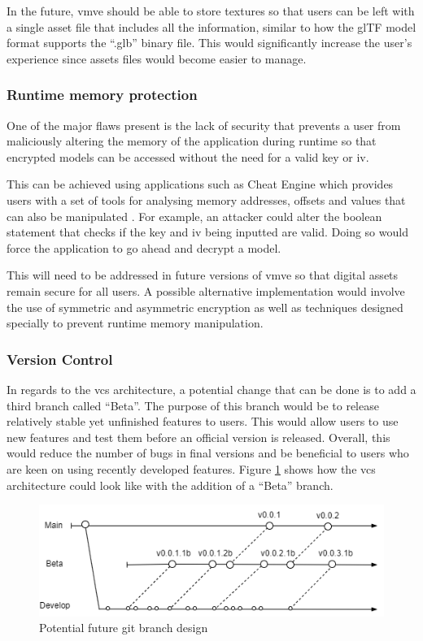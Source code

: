 \documentclass[11pt]{article}
\begin{document}
In the future, \gls*{vmve} should be able to store textures so that users can be
left with a single asset file that includes all the information, similar to how
the glTF model format supports the ``.glb'' binary file. This would
significantly increase the user's experience since assets files would become
easier to manage.

\subsubsection{Runtime memory protection}
One of the major flaws present is the lack of security that prevents a user from
maliciously altering the memory of the application during runtime so that
encrypted models can be accessed without the need for a valid key or iv.

This can be achieved using applications such as Cheat Engine which provides
users with a set of tools for analysing memory addresses, offsets and values
that can also be manipulated \cite{cheat_engine}. For example, an attacker could
alter the boolean statement that checks if the key and iv being inputted are
valid. Doing so would force the application to go ahead and decrypt a model.

This will need to be addressed in future versions of \gls*{vmve} so that digital
assets remain secure for all users. A possible alternative implementation would
involve the use of symmetric and asymmetric encryption as well as techniques
designed specially to prevent runtime memory manipulation.

\subsubsection{Version Control}
In regards to the \gls*{vcs} architecture, a potential change that can be done is
to add a third branch called ``Beta''. The purpose of this branch would be to
release relatively stable yet unfinished features to users. This would allow
users to use new features and test them before an official version is released.
Overall, this would reduce the number of bugs in final versions and be
beneficial to users who are keen on using recently developed features. Figure
\ref{fig:futurebrancharch} shows how the \gls*{vcs} architecture could look like
with the addition of a ``Beta'' branch.

\begin{figure}[H]
  \centering
  \includegraphics[width=\textwidth]{images/future_branch_design.png}
  \caption{Potential future git branch design}
  \label{fig:futurebrancharch}
\end{figure}
\end{document}
